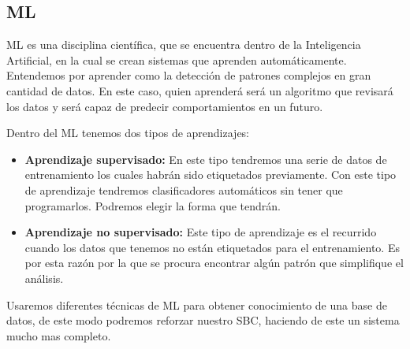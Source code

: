 \subsection{\acl{ML}}
\acf{ML} es una disciplina científica, que se encuentra dentro de la Inteligencia
 Artificial, en la cual se crean sistemas que aprenden automáticamente. Entendemos por aprender
 como la detección de patrones complejos en gran cantidad de datos. En este caso, quien aprenderá
 será un algoritmo que revisará los datos y será capaz de predecir comportamientos en un futuro.

Dentro del \acs{ML} tenemos dos tipos de aprendizajes:

\begin{itemize}
  \item \textbf{Aprendizaje supervisado:} En este tipo tendremos una serie de datos de entrenamiento
    los cuales habrán sido etiquetados previamente. Con este tipo de aprendizaje tendremos clasificadores
    automáticos sin tener que programarlos. Podremos elegir la forma que tendrán.
  \item \textbf{Aprendizaje no supervisado:} Este tipo de aprendizaje es el recurrido cuando
    los datos que tenemos no están etiquetados para el entrenamiento. Es por esta razón por la que
    se procura encontrar algún patrón que simplifique el análisis.
\end{itemize}

Usaremos diferentes técnicas de \acs{ML} para obtener conocimiento de una base de datos, de este modo
podremos reforzar nuestro \acs{SBC}, haciendo de este un sistema mucho mas
completo.
